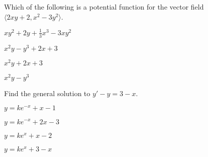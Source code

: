 \begin{readinessAssuranceTest}
\vfill
\item
Which of the following is a potential function for the vector field \( \langle 2xy+2, x^2-3y^2 \rangle \).
\begin{multicols}{4}
\begin{readinessAssuranceTestChoices}
\item \( xy^2+2y+\frac{1}{3}x^3-3xy^2\) 
\item \( x^2y-y^3+2x+3\) %
\item \( x^2y+2x+3\) 
\item \( x^2y-y^3\) 
\end{readinessAssuranceTestChoices}
\end{multicols}


\vfill

\item Find the general solution to \(y'-y=3-x\).
\begin{multicols}{4}
\begin{readinessAssuranceTestChoices}
\item \(y=ke^{-x}+x-1\) 
\item \(y=ke^{-x}+2x-3\) 
\item \(y=ke^x+x-2\) %
\item \(y=ke^x+3-x\) 
\end{readinessAssuranceTestChoices}
\end{multicols}

\vfill

\end{readinessAssuranceTest}

